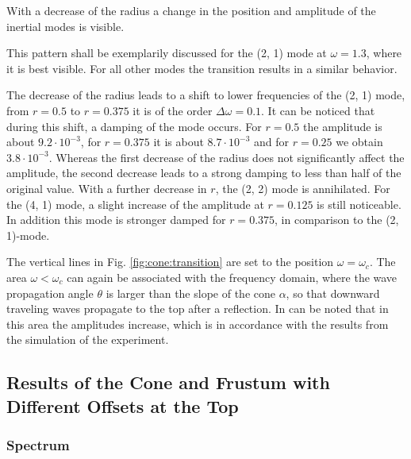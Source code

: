 With a decrease of the radius a change in the position and amplitude of the
inertial modes is visible.

This pattern shall be exemplarily discussed  for the (2, 1) mode at $\omega=1.3$, where it is best visible.
For all other modes the transition results in a similar behavior.

The decrease of the radius leads to a shift to lower frequencies of the (2, 1) mode,
from $r=0.5$ to $r=0.375$ it is of the order $\Delta \omega=0.1$.
It can be noticed that during this shift, a damping of the mode occurs.
For $r=0.5$ the amplitude is about $9.2\cdot10^{-3}$, for $r=0.375$ it is
about $8.7\cdot10^{-3}$ and for $r=0.25$ we obtain $3.8\cdot10^{-3}$.
Whereas the first decrease of the radius does not significantly affect the amplitude,
the second decrease leads to a strong damping to less than half of the original value.
With a further decrease in $r$, the (2, 2) mode is annihilated.
For the (4, 1) mode, a slight increase of the amplitude at $r=0.125$ is still noticeable.
In addition this mode is stronger damped for $r=0.375$, in comparison to the (2, 1)-mode.

The vertical lines in Fig. \ref{fig:cone:transition} are set to the position $\omega=\omega_c$.
The area $\omega<\omega_c$ can again be associated with the frequency domain, where the wave propagation angle $\theta$ is larger than
the  slope of the cone $\alpha$, so that downward traveling waves propagate to the top after a reflection.
In can be noted that in this area the amplitudes increase, which is in accordance with the
results from the simulation of the experiment.

\clearpage


\subsection{Results of the Cone and Frustum with Different Offsets at the Top}
\subsubsection{Spectrum}

